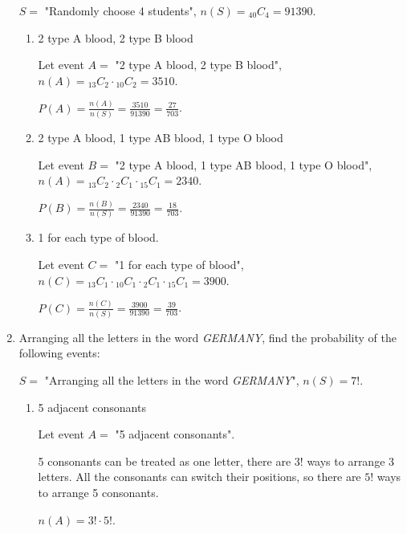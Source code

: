 \documentclass{report}
\newcommand\comb[2][^n]{{}_{#1}C_{#2}}
\begin{document}
\begin{multicols}{2}
\begin{enumerate}
          $S =$ "Randomly choose 4 students", $n(S) = \comb[40]{4} = 91390$.
          \begin{enumerate}
            \item 2 type A blood, 2 type B blood
                  \sol{}

                  Let event $A =$ "2 type A blood, 2 type B blood", $n(A) = \comb[13]{2} \cdot
                    \comb[10]{2} = 3510$.

                  $P(A) = \frac{n(A)}{n(S)} = \frac{3510}{91390} = \frac{27}{703}$.

            \item 2 type A blood, 1 type AB blood, 1 type O blood
                  \sol{}

                  Let event $B =$ "2 type A blood, 1 type AB blood, 1 type O blood", $n(A) =
                    \comb[13]{2} \cdot \comb[2]{1} \cdot \comb[15]{1} = 2340$.

                  $P(B) = \frac{n(B)}{n(S)} = \frac{2340}{91390} = \frac{18}{703}$.

            \item 1 for each type of blood.
                  \sol{}

                  Let event $C =$ "1 for each type of blood", $n(C) = \comb[13]{1} \cdot
                    \comb[10]{1} \cdot \comb[2]{1} \cdot \comb[15]{1} = 3900$.

                  $P(C) = \frac{n(C)}{n(S)} = \frac{3900}{91390} = \frac{39}{703}$.
          \end{enumerate}

    \item Arranging all the letters in the word \textit{GERMANY}, find the probability of
          the following events: \sol{}

          $S =$ "Arranging all the letters in the word \textit{GERMANY}", $n(S) = 7!$.

          \begin{enumerate}
            \item 5 adjacent consonants
                  \sol{}

                  Let event $A =$ "5 adjacent consonants".

                  5 consonants can be treated as one letter, there are $3!$ ways to arrange 3 letters. All the consonants can switch their positions, so there are $5!$ ways to arrange 5 consonants.

                  $n(A) = 3! \cdot 5!$.


\end{enumerate}
\end{enumerate}
\end{multicols}
\end{document}
